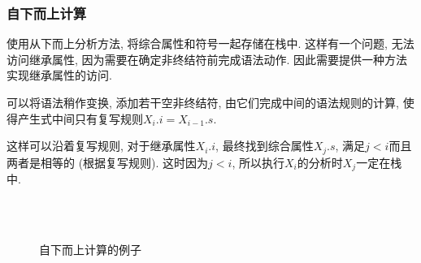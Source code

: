 \documentclass{ctexart}
\begin{document}
\subsubsection{自下而上计算}
    使用从下而上分析方法, 将综合属性和符号一起存储在栈中.
    这样有一个问题, 无法访问继承属性, 因为需要在确定非终结符前完成语法动作.
    因此需要提供一种方法实现继承属性的访问.\par
    可以将语法稍作变换, 添加若干空非终结符,
    由它们完成中间的语法规则的计算, 
    使得产生式中间只有复写规则$X_i.i = X_{i-1}.s$.\par
    这样可以沿着复写规则, 对于继承属性$X_i.i$,
    最终找到综合属性$X_j.s$,
    满足$j<i$而且两者是相等的 (根据复写规则).
    这时因为$j < i$, 所以执行$X_i$的分析时$X_j$一定在栈中.
    \begin{figure}%
        \centering
        \\
        \\
        \caption{自下而上计算的例子}%
    \end{figure}
    \FloatBarrier
\end{document}

